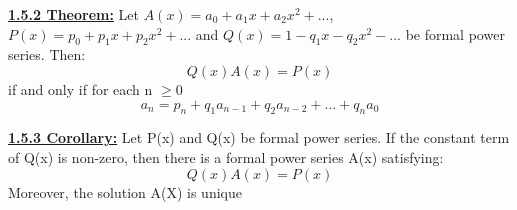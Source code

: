 \documentclass[12pt]{article}
\newcommand{\myt}[1]{\textbf{\underline{#1}}}
\begin{document}
	\myt{1.5.2 Theorem:} Let $A(x) = a_0 + a_1x + a_2x^2 + ...$, $P(x) = p_0 + p_1x +p_2x^2 + ...$ and $Q(x) = 1 - q_1x - q_2x^2 - ...$ be formal power series. Then:\\
	$$Q(x)A(x) = P(x)$$
	if and only if for each n $\geq 0$\\
	$$a_n = p_n + q_1a_{n-1} + q_2a_{n-2} + ... + q_na_0$$
	
	\myt{1.5.3 Corollary:} Let P(x) and Q(x) be formal power series. If the constant term of Q(x) is non-zero, then there is a formal power series A(x) satisfying:\\
	$$Q(x)A(x) = P(x)$$
	Moreover, the solution A(X) is unique\\
	
	
	
	
\end{document}
